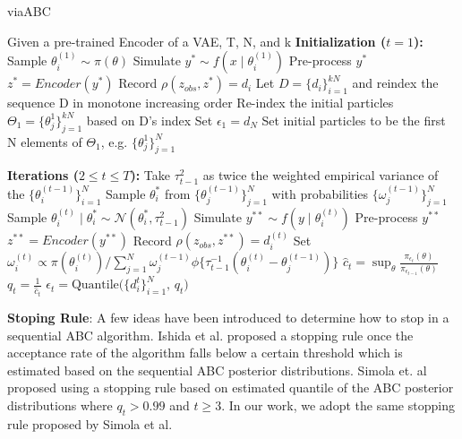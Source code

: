 \documentclass[12pt]{article} %
\begin{document}
\begin{algorithm}[H]
\caption{viaABC}
\begin{algorithmic}[1]
\State Given a pre-trained Encoder of a VAE, T, N, and k
\Statex \textbf{Initialization ($t=1$):}
    \State Sample $\theta^{(1)}_{i} \sim \pi(\theta)$
    \State Simulate $y^* \sim f(x \mid \theta^{(1)}_{i})$
    \State Pre-process $y^*$
    \State $z^* = Encoder(y^*)$
    \State Record $\rho(z_{obs}, z^*) = d_i$
\EndFor
\State Let $D =\{d_i\}_{i=1}^{kN}$ and reindex the sequence D in monotone increasing order
\State Re-index the initial particles $\Theta_1 = \{\theta^{1}_{j}\}_{j=1}^{kN}$ based on D's index
\State Set $\epsilon_1 = d_{N}$
\State Set initial particles to be the first N elements of $\Theta_1$, e.g. $\{\theta^{1}_{j}\}_{j=1}^{N}$

\Statex \textbf{Iterations ($2 \leqslant t \leqslant T$):}
    \State Take $\tau^{2}_{t-1}$ as twice the weighted empirical variance of the $\{\theta^{(t-1)}_{i}\}_{i=1}^N$
        \Repeat
            \State Sample $\theta^{*}_{i}$ from $\{\theta^{(t-1)}_{j}\}_{j=1}^{N}$ with probabilities $\{\omega^{(t-1)}_{j}\}_{j=1}^{N}$
            \State Sample $\theta^{(t)}_{i} \mid \theta^{*}_{i} \sim \mathcal{N}(\theta^{*}_{i}, \tau^{2}_{t-1})$
            \State Simulate $y^{**} \sim f(y \mid \theta^{(t)}_{i})$
            \State Pre-process $y^{**}$
            \State $z^{**} = Encoder(y^{**})$
        \State Record $\rho(z_{obs}, z^{**}) = d_i^{(t)}$
        \State Set $\omega^{(t)}_{i} \propto \pi(\theta^{(t)}_{i}) / \sum_{j=1}^{N} \omega^{(t-1)}_{j} \phi\{\tau^{-1}_{t-1}(\theta^{(t)}_{i} - \theta^{(t-1)}_{j})\}$
    \EndFor
    \State $\hat c_t = \sup_{\theta} \frac{\pi_{\epsilon_t}(\theta)}{\pi_{\epsilon_{t-1}}(\theta)}$
    \State $q_t = \frac{1}{\hat c_t}$
    \State $\epsilon_t = \text{Quantile($\{d_i^{t}\}_{i=1}^N$, $q_t$})$
\EndFor
\end{algorithmic}
\end{algorithm}

\textbf{Stoping Rule}: 
A few ideas have been introduced to determine how to stop in a sequential ABC algorithm. Ishida et al. \citep{ishida2015cosmoabc} proposed a stopping rule once the acceptance rate of the algorithm  falls below a certain threshold which is estimated based on the sequential ABC posterior distributions. Simola et. al \citep{simola2021adaptive} proposed using a stopping rule based on estimated quantile of the ABC posterior distributions where $q_t > 0.99$ and $ t \geq 3$. In our work, we adopt the same stopping rule proposed by Simola et al.
\end{document}
